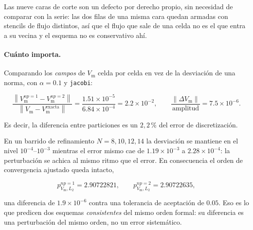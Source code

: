 \documentclass[11pt,a4paper]{article}
\newcommand{\code}[1]{\texttt{\small #1}}
\newcommand{\norm}[1]{\left\lVert #1 \right\rVert}
\begin{document}
Las nueve caras de corte son un defecto por derecho propio, sin necesidad de
comparar con la serie: las dos filas de una misma cara quedan armadas con
stencils de flujo distintos, así que el flujo que sale de una celda no es el que
entra a su vecina y el esquema no es conservativo ahí.

\paragraph{Cuánto importa.} Comparando los \emph{campos} de $V_{\mathrm{m}}$
celda por celda en vez de la desviación de una norma, con $\alpha=0.1$ y
\code{jacobi}:

\[
  \frac{\norm{V_{\mathrm{m}}^{np=1}-V_{\mathrm{m}}^{np=2}}}
       {\norm{V_{\mathrm{m}}-V_{\mathrm{m}}^{\text{exacta}}}}
  = \frac{1.51\times10^{-5}}{6.84\times10^{-4}} = 2.2\times10^{-2},
  \qquad
  \frac{\norm{\Delta V_{\mathrm{m}}}}{\text{amplitud}} = 7.5\times10^{-6}.
\]

Es decir, la diferencia entre particiones es un $2{,}2\,$\% del error de
discretización.

En un barrido de refinamiento $N=8,10,12,14$ la desviación se mantiene en el
nivel $10^{-4}$--$10^{-3}$ mientras el error mismo cae de $1.19\times10^{-3}$ a
$2.28\times10^{-4}$: la perturbación se achica al mismo ritmo que el error. En
consecuencia el orden de convergencia ajustado queda intacto,

\[
  p^{np=1}_{V_{\mathrm{m}},L_2} = 2.90722821,
  \qquad
  p^{np=2}_{V_{\mathrm{m}},L_2} = 2.90722635,
\]

una diferencia de $1.9\times10^{-6}$ contra una tolerancia de aceptación de
$0.05$. Eso es lo que predicen dos esquemas \emph{consistentes} del mismo orden
formal: su diferencia es una perturbación del mismo orden, no un error
sistemático.
\end{document}
